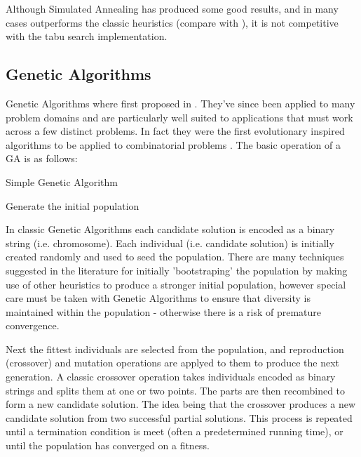 Although Simulated Annealing has produced some good results, and in many cases outperforms the classic heuristics (compare \cite{Laporte:1999} with \cite{GLP:1999}), it is not competitive with the tabu search implementation. 

\subsection{Genetic Algorithms}

Genetic Algorithms where first proposed in \cite{Holland:1975}. They've since been applied to many problem domains and are particularly well suited to applications that must work across a few distinct problems. In fact they were the first evolutionary inspired algorithms to be applied to combinatorial problems \cite{Potvin:2009}. The basic operation of a GA is as follows:

\begin{algorithm}
   \caption{Simple Genetic Algorithm}
   Generate the initial population\\
\end{algorithm}

In classic Genetic Algorithms each candidate solution is encoded as a binary string (i.e. chromosome). Each individual (i.e. candidate solution) is initially created randomly and used to seed the population. There are many techniques suggested in the literature for initially 'bootstraping' the population by making use of other heuristics to produce a stronger initial population, however special care must be taken with Genetic Algorithms to ensure that diversity is maintained within the population - otherwise there is a risk of premature convergence. 

Next the fittest individuals are selected from the population, and reproduction (crossover) and mutation operations are applyed to them to produce the next generation. A classic crossover operation takes individuals encoded as binary strings and splits them at one or two points. The parts are then recombined to form a new candidate solution. The idea being that the crossover produces a new candidate solution from two successful partial solutions. This process is repeated until a termination condition is meet (often a predetermined running time), or until the population has converged on a fitness.


